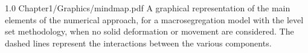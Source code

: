 \begin{figureth}
{1.0}
{Chapter1/Graphics/mindmap.pdf}
{A graphical representation of the main elements of the numerical approach, 
for a macrosegregation model with the level set methodology, when no solid deformation or movement are considered. 
The dashed lines represent the interactions between the various components.}
\label{fig:mindmap}
\end{figureth}





